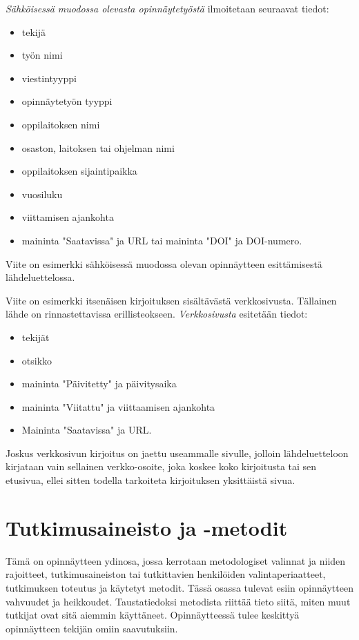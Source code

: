 \documentclass[finnish, 12pt, a4paper, arts, utf8, a-2b, online]{aaltothesis}
\begin{document}
\noindent
\textit{Sähköisessä muodossa olevasta opinnäytetyöstä} ilmoitetaan
seuraavat tiedot:
\begin{itemize}
	\setlength{\itemsep}{-3pt}
	\item[--]tekijä
	\item[--]työn nimi
	\item[--]viestintyyppi
	\item[--]opinnäytetyön tyyppi
	\item[--]oppilaitoksen nimi
	\item[--]osaston, laitoksen tai ohjelman nimi
	\item[--]oppilaitoksen sijaintipaikka
	\item[--]vuosiluku
	\item[--]viittamisen ajankohta
	\item[--]maininta "Saatavissa" ja URL tai 
	maininta "DOI" ja DOI-numero.
\end{itemize}
Viite \cite{Adida} on esimerkki sähköisessä muodossa olevan opinnäytteen 
esittämisestä lähdeluettelossa.

\noindent
Viite \cite{viittaaminen} on esimerkki itsenäisen kirjoituksen sisältävästä
verkkosivusta. Tällainen lähde on rinnastettavissa erillisteokseen.
\textit{Verkkosivusta} esitetään tiedot:
\begin{itemize}
	\setlength{\itemsep}{-3pt}
	\item[--] tekijät
	\item[--] otsikko
	\item[--] maininta "Päivitetty" ja päivitysaika 
	\item[--] maininta "Viitattu" ja viittaamisen ajankohta
	\item[--] Maininta "Saatavissa" ja URL.
\end{itemize}
Joskus verkkosivun kirjoitus on jaettu useammalle sivulle, jolloin
lähdeluetteloon kirjataan vain sellainen verkko-osoite, joka koskee koko 
kirjoitusta tai sen etusivua, ellei sitten todella tarkoiteta kirjoituksen 
yksittäistä sivua. 


\clearpage
\section{Tutkimusaineisto ja -metodit}

Tämä on opinnäytteen ydinosa, jossa kerrotaan metodologiset valinnat ja niiden 
rajoitteet, tutkimusaineiston tai tutkittavien henkilöiden valintaperiaatteet, 
tutkimuksen toteutus ja käytetyt metodit. Tässä osassa tulevat esiin 
opinnäytteen vahvuudet ja heikkoudet. Taustatiedoksi metodista riittää tieto 
siitä, miten muut tutkijat ovat sitä aiemmin käyttäneet. Opinnäytteessä tulee 
keskittyä opinnäytteen tekijän omiin saavutuksiin.
\end{document}
